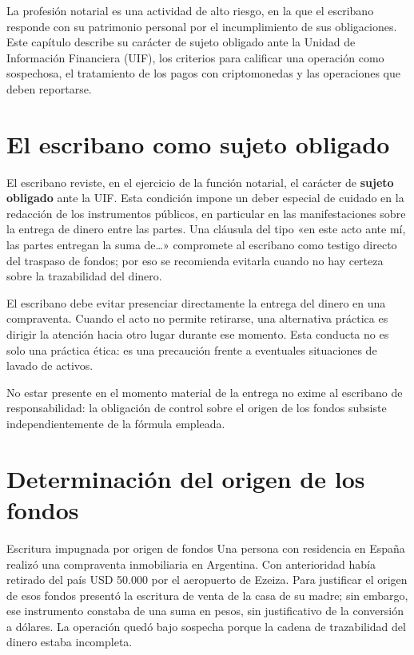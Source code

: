 \documentclass[12pt,oneside]{book}
\begin{document}
La profesión notarial es una actividad de alto riesgo, en la que el escribano responde con su patrimonio personal por el incumplimiento de sus obligaciones. Este capítulo describe su carácter de sujeto obligado ante la Unidad de Información Financiera (UIF), los criterios para calificar una operación como sospechosa, el tratamiento de los pagos con criptomonedas y las operaciones que deben reportarse.

\section{El escribano como sujeto obligado}

El escribano reviste, en el ejercicio de la función notarial, el carácter de \textbf{sujeto obligado} ante la UIF. Esta condición impone un deber especial de cuidado en la redacción de los instrumentos públicos, en particular en las manifestaciones sobre la entrega de dinero entre las partes. Una cláusula del tipo «en este acto ante mí, las partes entregan la suma de\ldots{}» compromete al escribano como testigo directo del traspaso de fondos; por eso se recomienda evitarla cuando no hay certeza sobre la trazabilidad del dinero.

\begin{important}
El escribano debe evitar presenciar directamente la entrega del dinero en una compraventa. Cuando el acto no permite retirarse, una alternativa práctica es dirigir la atención hacia otro lugar durante ese momento. Esta conducta no es solo una práctica ética: es una precaución frente a eventuales situaciones de lavado de activos.
\end{important}

\begin{note}
No estar presente en el momento material de la entrega no exime al escribano de responsabilidad: la obligación de control sobre el origen de los fondos subsiste independientemente de la fórmula empleada.
\end{note}

\section{Determinación del origen de los fondos}

\begin{example}{Escritura impugnada por origen de fondos}
Una persona con residencia en España realizó una compraventa inmobiliaria en Argentina. Con anterioridad había retirado del país USD 50.000 por el aeropuerto de Ezeiza. Para justificar el origen de esos fondos presentó la escritura de venta de la casa de su madre; sin embargo, ese instrumento constaba de una suma en pesos, sin justificativo de la conversión a dólares. La operación quedó bajo sospecha porque la cadena de trazabilidad del dinero estaba incompleta.
\end{example}
\end{document}
